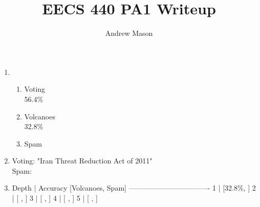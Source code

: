 \documentclass[12pt]{article}
\title{EECS 440 PA1 Writeup}
\author{Andrew Mason}
\begin{document}
\maketitle

\begin{enumerate}
  \item
    \begin{enumerate}
      \item Voting\\
        56.4\%
      \item Volcanoes\\
        32.8\%
      \item Spam\\
    \end{enumerate}
  \item
    Voting: "Iran Threat Reduction Act of 2011"\\
    Spam: %
  \item
    Depth | Accuracy [Volcanoes, Spam]
    ----------------------------------
        1 | [32.8\%, ]
        2 | [ , ]
        3 | [ , ]
        4 | [ , ]
        5 | [ , ]

\end{enumerate}
\end{document}

